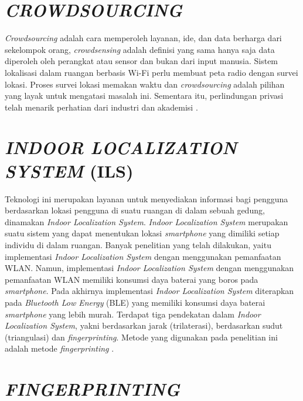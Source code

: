 \section{\uppercase{\textit{CROWDSOURCING}}}
\textit{Crowdsourcing} adalah cara memperoleh layanan, ide, dan data berharga dari sekelompok orang, \textit{crowdsensing} adalah definisi yang sama hanya saja data diperoleh oleh perangkat atau sensor dan bukan dari input manusia. Sistem lokalisasi dalam ruangan berbasis Wi-Fi perlu membuat peta radio dengan survei lokasi. Proses survei lokasi memakan waktu dan \textit{crowdsourcing} adalah pilihan yang layak untuk mengatasi masalah ini. Sementara itu, perlindungan privasi telah menarik perhatian dari industri dan akademisi \citep{Li2018}.

\section{\uppercase{\textit{INDOOR LOCALIZATION SYSTEM} (ILS)}}
Teknologi ini merupakan layanan untuk menyediakan informasi bagi pengguna berdasarkan lokasi pengguna di suatu ruangan di dalam sebuah gedung, dinamakan \textit{Indoor Localization System}. \textit{Indoor Localization System} merupakan suatu sistem yang dapat menentukan lokasi \textit{smartphone} yang dimiliki setiap individu di dalam ruangan. Banyak penelitian yang telah dilakukan, yaitu implementasi \textit{Indoor Localization System} dengan menggunakan pemanfaatan WLAN. Namun, implementasi \textit{Indoor Localization System} dengan menggunakan pemanfaatan WLAN memiliki konsumsi daya baterai yang boros pada \textit{smartphone}. Pada akhirnya implementasi \textit{Indoor Localization System} diterapkan pada \textit{Bluetooth Low Energy }(BLE) yang memiliki konsumsi daya baterai \textit{smartphone} yang lebih murah. Terdapat tiga pendekatan dalam \textit{Indoor Localization System}, yakni berdasarkan jarak (trilaterasi), berdasarkan sudut (triangulasi) dan \textit{fingerprinting}. Metode yang digunakan pada penelitian ini adalah metode \textit{fingerprinting} \citep{Santos2021}.


\section{\uppercase{\textit{FINGERPRINTING}}}

